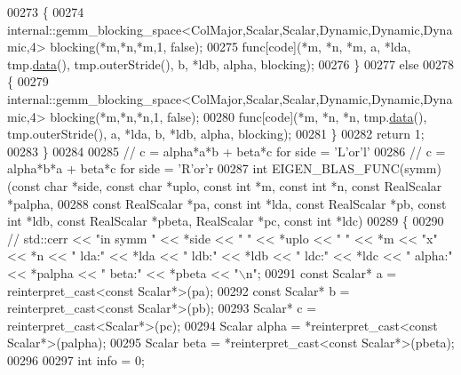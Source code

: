 \begin{DoxyCode}
00273   \{
00274     internal::gemm\_blocking\_space<ColMajor,Scalar,Scalar,Dynamic,Dynamic,Dynamic,4> blocking(*m,*n,*m,1,\textcolor{keyword}{
      false});
00275     func[code](*m, *n, *m, a, *lda, tmp.\hyperlink{class_eigen_1_1_plain_object_base_ac25699535374b1854cf8494e44ad31b2}{data}(), tmp.outerStride(), b, *ldb, alpha, blocking);
00276   \}
00277   \textcolor{keywordflow}{else}
00278   \{
00279     internal::gemm\_blocking\_space<ColMajor,Scalar,Scalar,Dynamic,Dynamic,Dynamic,4> blocking(*m,*n,*n,1,\textcolor{keyword}{
      false});
00280     func[code](*m, *n, *n, tmp.\hyperlink{class_eigen_1_1_plain_object_base_ac25699535374b1854cf8494e44ad31b2}{data}(), tmp.outerStride(), a, *lda, b, *ldb, alpha, blocking);
00281   \}
00282   \textcolor{keywordflow}{return} 1;
00283 \}
00284 
00285 \textcolor{comment}{// c = alpha*a*b + beta*c  for side = 'L'or'l'}
00286 \textcolor{comment}{// c = alpha*b*a + beta*c  for side = 'R'or'r}
00287 \textcolor{keywordtype}{int} EIGEN\_BLAS\_FUNC(symm)(\textcolor{keyword}{const} \textcolor{keywordtype}{char} *side, \textcolor{keyword}{const} \textcolor{keywordtype}{char} *uplo, \textcolor{keyword}{const} \textcolor{keywordtype}{int} *m, \textcolor{keyword}{const} \textcolor{keywordtype}{int} *n, \textcolor{keyword}{const} RealScalar 
      *palpha,
00288                           \textcolor{keyword}{const} RealScalar *pa, \textcolor{keyword}{const} \textcolor{keywordtype}{int} *lda, \textcolor{keyword}{const} RealScalar *pb, \textcolor{keyword}{const} \textcolor{keywordtype}{int} *ldb, \textcolor{keyword}{const}
       RealScalar *pbeta, RealScalar *pc, \textcolor{keyword}{const} \textcolor{keywordtype}{int} *ldc)
00289 \{
00290 \textcolor{comment}{//   std::cerr << "in symm " << *side << " " << *uplo << " " << *m << "x" << *n << " lda:" << *lda << "
       ldb:" << *ldb << " ldc:" << *ldc << " alpha:" << *palpha << " beta:" << *pbeta << "\(\backslash\)n";}
00291   \textcolor{keyword}{const} Scalar* a = \textcolor{keyword}{reinterpret\_cast<}\textcolor{keyword}{const }Scalar*\textcolor{keyword}{>}(pa);
00292   \textcolor{keyword}{const} Scalar* b = \textcolor{keyword}{reinterpret\_cast<}\textcolor{keyword}{const }Scalar*\textcolor{keyword}{>}(pb);
00293   Scalar* c = \textcolor{keyword}{reinterpret\_cast<}Scalar*\textcolor{keyword}{>}(pc);
00294   Scalar alpha = *\textcolor{keyword}{reinterpret\_cast<}\textcolor{keyword}{const }Scalar*\textcolor{keyword}{>}(palpha);
00295   Scalar beta  = *\textcolor{keyword}{reinterpret\_cast<}\textcolor{keyword}{const }Scalar*\textcolor{keyword}{>}(pbeta);
00296 
00297   \textcolor{keywordtype}{int} info = 0;

\end{DoxyCode}
